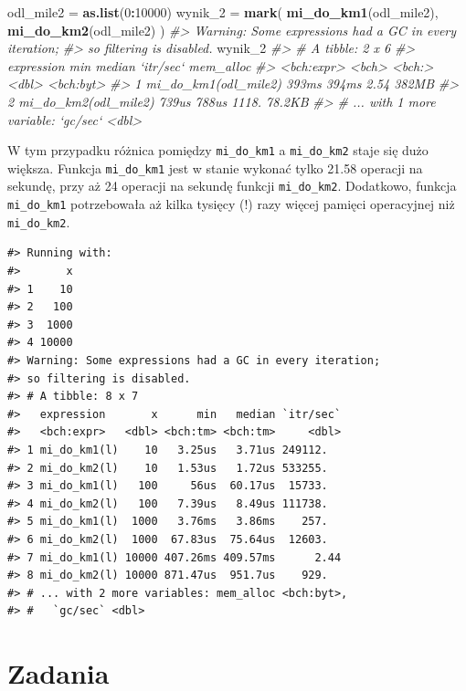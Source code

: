 \documentclass[paper=6in:9in,pagesize=pdftex,headinclude=on,footinclude=on,10pt]{scrbook}
\newenvironment{Shaded}{\begin{snugshade}}{\end{snugshade}}
\newcommand{\CommentTok}[1]{\textcolor[rgb]{0.56,0.35,0.01}{\textit{#1}}}
\newcommand{\DecValTok}[1]{\textcolor[rgb]{0.00,0.00,0.81}{#1}}
\newcommand{\KeywordTok}[1]{\textcolor[rgb]{0.13,0.29,0.53}{\textbf{#1}}}
\newcommand{\NormalTok}[1]{#1}
\newcommand{\OperatorTok}[1]{\textcolor[rgb]{0.81,0.36,0.00}{\textbf{#1}}}
\newcommand{\StringTok}[1]{\textcolor[rgb]{0.31,0.60,0.02}{#1}}
\begin{document}
\begin{Shaded}
\begin{Highlighting}[]
\NormalTok{odl_mile2 =}\StringTok{ }\KeywordTok{as.list}\NormalTok{(}\DecValTok{0}\OperatorTok{:}\DecValTok{10000}\NormalTok{)}
\NormalTok{wynik_}\DecValTok{2}\NormalTok{ =}\StringTok{ }\KeywordTok{mark}\NormalTok{(}
  \KeywordTok{mi_do_km1}\NormalTok{(odl_mile2),}
  \KeywordTok{mi_do_km2}\NormalTok{(odl_mile2)}
\NormalTok{)}
\CommentTok{#> Warning: Some expressions had a GC in every iteration;}
\CommentTok{#> so filtering is disabled.}
\NormalTok{wynik_}\DecValTok{2}
\CommentTok{#> # A tibble: 2 x 6}
\CommentTok{#>   expression             min median `itr/sec` mem_alloc}
\CommentTok{#>   <bch:expr>           <bch> <bch:>     <dbl> <bch:byt>}
\CommentTok{#> 1 mi_do_km1(odl_mile2) 393ms  394ms      2.54     382MB}
\CommentTok{#> 2 mi_do_km2(odl_mile2) 739us  788us   1118.      78.2KB}
\CommentTok{#> # ... with 1 more variable: `gc/sec` <dbl>}
\end{Highlighting}
\end{Shaded}

W tym przypadku różnica pomiędzy \texttt{mi\_do\_km1} a \texttt{mi\_do\_km2} staje się dużo większa.
Funkcja \texttt{mi\_do\_km1} jest w stanie wykonać tylko 21.58 operacji na sekundę, przy aż 24 operacji na sekundę funkcji \texttt{mi\_do\_km2}.
Dodatkowo, funkcja \texttt{mi\_do\_km1} potrzebowała aż kilka tysięcy (!) razy więcej pamięci operacyjnej niż \texttt{mi\_do\_km2}.

\begin{verbatim}
#> Running with:
#>       x
#> 1    10
#> 2   100
#> 3  1000
#> 4 10000
#> Warning: Some expressions had a GC in every iteration;
#> so filtering is disabled.
#> # A tibble: 8 x 7
#>   expression       x      min   median `itr/sec`
#>   <bch:expr>   <dbl> <bch:tm> <bch:tm>     <dbl>
#> 1 mi_do_km1(l)    10   3.25us   3.71us 249112.  
#> 2 mi_do_km2(l)    10   1.53us   1.72us 533255.  
#> 3 mi_do_km1(l)   100     56us  60.17us  15733.  
#> 4 mi_do_km2(l)   100   7.39us   8.49us 111738.  
#> 5 mi_do_km1(l)  1000   3.76ms   3.86ms    257.  
#> 6 mi_do_km2(l)  1000  67.83us  75.64us  12603.  
#> 7 mi_do_km1(l) 10000 407.26ms 409.57ms      2.44
#> 8 mi_do_km2(l) 10000 871.47us  951.7us    929.  
#> # ... with 2 more variables: mem_alloc <bch:byt>,
#> #   `gc/sec` <dbl>
\end{verbatim}

\hypertarget{zadania-10}{%
\section{Zadania}\label{zadania-10}}
\end{document}

